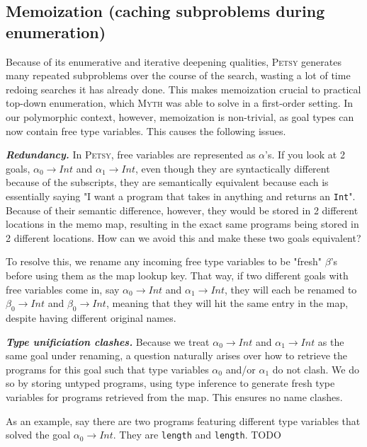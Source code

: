\documentclass[acmsmall,nonacm]{acmart}
\begin{document}
\subsection{Memoization (caching subproblems during enumeration)}

Because of its enumerative and iterative deepening qualities, \textsc{Petsy} 
generates many repeated subproblems
over the course of the search, wasting a lot of time redoing searches it has
already done. This makes memoization crucial to practical 
top-down enumeration, which \textsc{Myth} \cite{myth} was able to solve in a 
first-order setting.
In our polymorphic context, however, memoization is non-trivial, as goal types can now contain free 
type variables. This causes the following issues.

\vspace{2mm}
\noindent \textbf{\textit{Redundancy.}} In \textsc{Petsy}, free variables 
are represented as $\alpha$'s. If you look at 2 goals, $\alpha_0 \to Int$ 
and $\alpha_1 \to Int$, even though they are syntactically different because of the subscripts,
they are semantically equivalent because each is essentially saying "I want 
a program that takes in anything and returns an \texttt{Int}". Because 
of their semantic difference, however, they would be stored in 2 different 
locations in the memo map, resulting in the exact same programs being stored
in 2 different locations. 
How can we avoid this and make these two goals equivalent?

To resolve this, we rename any incoming free type variables 
to be "fresh" $\beta$'s before using them as the map lookup key. That way, if 
two different goals with free variables come in, say $\alpha_0 \to Int$ and 
$\alpha_1 \to Int$, they will each be renamed to $\beta_0 \to Int$ 
and $\beta_0 \to Int$, meaning that they will hit the same entry in the map,
despite having different original names.

\vspace{2mm}
\noindent \textbf{\textit{Type unificiation clashes.}} 
Because we treat $\alpha_0 \to Int$ and $\alpha_1 \to Int$ as the same goal
under renaming, a question naturally arises over how to retrieve the programs
for this goal such that type variables $\alpha_0$ and/or $\alpha_1$ do not clash.
We do so by storing untyped programs, using type inference to generate fresh
type variables for programs retrieved from the map. This ensures no name clashes.

As an example, say there are two programs featuring different type variables that
solved the goal $\alpha_0 \to Int$. They are \texttt{length} and \texttt{length}.
TODO
\end{document}
